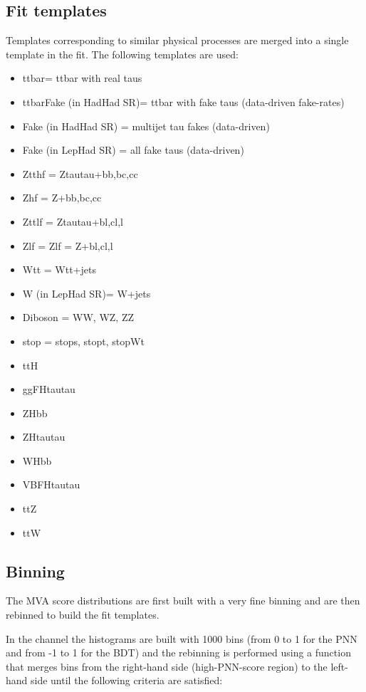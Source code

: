 \subsection{Fit templates}

Templates corresponding to similar physical processes are merged into a single template in the fit. The following templates are used:

\begin{itemize}
\item ttbar= ttbar with real taus
\item ttbarFake (in HadHad SR)= ttbar with fake taus (data-driven fake-rates)
\item Fake (in HadHad SR) = multijet tau fakes (data-driven)
\item Fake (in LepHad SR) = all fake taus (data-driven)
\item Ztthf = Ztautau+bb,bc,cc
\item Zhf = Z+bb,bc,cc
\item Zttlf = Ztautau+bl,cl,l
\item Zlf = Zlf = Z+bl,cl,l
\item Wtt = Wtt+jets
\item W (in LepHad SR)= W+jets 
\item Diboson = WW, WZ, ZZ
\item stop = stops, stopt, stopWt
\item ttH
\item ggFHtautau
\item ZHbb
\item ZHtautau
\item WHbb
\item VBFHtautau
\item ttZ
\item ttW
\end{itemize}

\subsection{Binning}
\label{subsec:binning}

The MVA score distributions are first built with a very fine binning and are then rebinned to build the fit templates. 

In the \hadhad channel the histograms are built with 1000 bins (from 0 to 1 for the PNN and from -1 to 1 for the BDT) and the rebinning is performed using a function that merges bins from the right-hand side (high-PNN-score region) to the left-hand side until the following criteria are satisfied:


